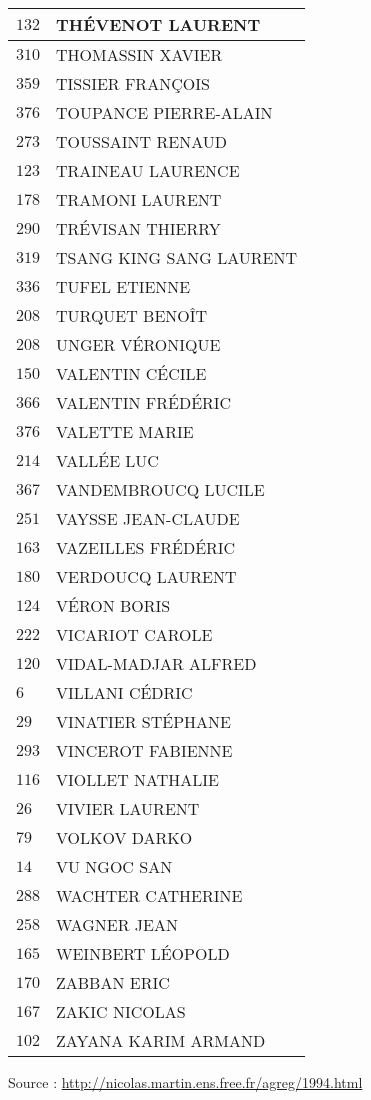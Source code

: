 \begin{xltabular}{\linewidth}{|l|X|}
    \hline
    $132$ & THÉVENOT LAURENT \\
    \hline
    $310$ & THOMASSIN XAVIER \\
    \hline
    $359$ & TISSIER FRANÇOIS \\
    \hline
    $376$ & TOUPANCE PIERRE-ALAIN \\
    \hline
    $273$ & TOUSSAINT RENAUD \\
    \hline
    $123$ & TRAINEAU LAURENCE \\
    \hline
    $178$ & TRAMONI LAURENT \\
    \hline
    $290$ & TRÉVISAN THIERRY \\
    \hline
    $319$ & TSANG KING SANG LAURENT \\
    \hline
    $336$ & TUFEL ETIENNE \\
    \hline
    $208$ & TURQUET BENOÎT \\
    \hline
    $208$ & UNGER VÉRONIQUE \\
    \hline
    $150$ & VALENTIN CÉCILE \\
    \hline
    $366$ & VALENTIN FRÉDÉRIC \\
    \hline
    $376$ & VALETTE MARIE \\
    \hline
    $214$ & VALLÉE LUC \\
    \hline
    $367$ & VANDEMBROUCQ LUCILE \\
    \hline
    $251$ & VAYSSE JEAN-CLAUDE \\
    \hline
    $163$ & VAZEILLES FRÉDÉRIC \\
    \hline
    $180$ & VERDOUCQ LAURENT \\
    \hline
    $124$ & VÉRON BORIS \\
    \hline
    $222$ & VICARIOT CAROLE \\
    \hline
    $120$ & VIDAL-MADJAR ALFRED \\
    \hline
    $6$ & VILLANI CÉDRIC \\
    \hline
    $29$ & VINATIER STÉPHANE \\
    \hline
    $293$ & VINCEROT FABIENNE \\
    \hline
    $116$ & VIOLLET NATHALIE \\
    \hline
    $26$ & VIVIER LAURENT \\
    \hline
    $79$ & VOLKOV DARKO \\
    \hline
    $14$ & VU NGOC SAN \\
    \hline
    $288$ & WACHTER CATHERINE \\
    \hline
    $258$ & WAGNER JEAN \\
    \hline
    $165$ & WEINBERT LÉOPOLD \\
    \hline
    $170$ & ZABBAN ERIC \\
    \hline
    $167$ & ZAKIC NICOLAS \\
    \hline
    $102$ & ZAYANA KARIM ARMAND \\
    \hline
  \end{xltabular}

  \begin{flushright}
    {\tiny Source : \url{http://nicolas.martin.ens.free.fr/agreg/1994.html}}
  \end{flushright}

